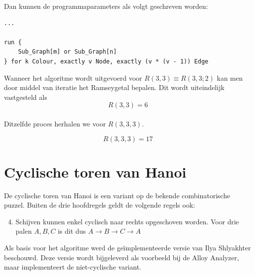 \documentclass[10pt,a4paper]{article}
\begin{document}
		\noindent Dan kunnen de programmaparameters als volgt geschreven worden:\\

		\begin{lstlisting}
...

run {
	Sub_Graph[m] or Sub_Graph[n]
} for k Colour, exactly v Node, exactly (v * (v - 1)) Edge
		\end{lstlisting}

		Wanneer het algoritme wordt uitgevoerd voor $R(3, 3) \equiv R(3, 3; 2)$ kan men door middel van iteratie het Ramseygetal bepalen. Dit wordt uiteindelijk vastgesteld als
		\begin{equation}
			R(3, 3) = 6
		\end{equation}\\

		\noindent Ditzelfde proces herhalen we voor $R(3, 3, 3)$.

		\begin{equation}
			R(3, 3, 3) = 17
		\end{equation}

		\clearpage{}
		

	\clearpage{}
	\section{Cyclische toren van Hanoi}
		De cyclische toren van Hanoi is een variant op de bekende combinatorische puzzel. Buiten de drie hoofdregels geldt de volgende regels ook:
		\begin{enumerate}
			\setcounter{enumi}{3}
			\item Schijven kunnen enkel cyclisch naar rechts opgeschoven worden. Voor drie palen $A, B, C$ is dit dus $A \rightarrow B \rightarrow C \rightarrow A$
		\end{enumerate}

		\noindent Als basis voor het algoritme werd de ge\"implementeerde versie van Ilya Shlyakhter beschouwd. Deze versie wordt bijgeleverd als voorbeeld bij de Alloy Analyzer, maar implementeert de niet-cyclische variant.

		
\end{document}
